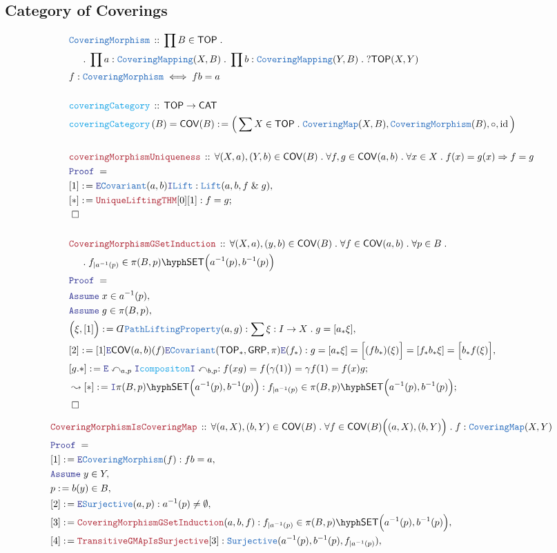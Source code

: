 \documentclass[12pt]{scrartcl}
\newcommand{\TYPE}[1]{\textcolor{NavyBlue}{\mathtt{#1}}}
\newcommand{\FUNC}[1]{\textcolor{Cerulean}{\mathtt{#1}}}
\newcommand{\LOGIC}[1]{\textcolor{Blue}{\mathtt{#1}}}
\newcommand{\THM}[1]{\textcolor{Maroon}{\mathtt{#1}}}
\renewcommand{\.}{\; . \;}
\newcommand{\de}{: \kern 0.1pc =}
\newcommand{\Act}[1]{\left( #1 \right)}
\newcommand{\Theorem}[2]{& \THM{#1} \, :: \, #2 \\ & \Proof = \\ }
\newcommand{\DeclareType}[2]{& \TYPE{#1} \, :: \, #2 \\}
\newcommand{\DefineType}[3]{& #1 : \TYPE{#2} \iff #3 \\}
\newcommand{\DeclareFunc}[2]{& \FUNC{#1} \, :: \, #2 \\}
\newcommand{\DefineNamedFunc}[4]{&  \FUNC{#1}\Act{#2} = #3 \de #4 \\}
\newcommand{\NewLine}{\\ & \kern 1pc}
\newcommand{\Page}[1]{ \begin{align*} #1 \end{align*}   }
\newcommand{ \bd }{ \ByDef }
\renewcommand{\And}{\; \& \;}
\newcommand{\Imply}{\Rightarrow}
\newcommand{\Intro}{\LOGIC{I}}
\newcommand{\Elim}{\LOGIC{E}}
\DeclareMathOperator*{\id}{id}
\newcommand{\Say}[3]{& #1 \de #2 : #3, \\}
\newcommand{\SayIn}[3]{& #1 \de #2 \in #3, \\}
\newcommand{\Conclude}[3]{& #1 \de #2 : #3; \\}
\newcommand{\DeriveConclude}[3]{& \leadsto #1 \de #2 : #3 ; \\}
\newcommand{\AssumeIn}[2]{& \LOGIC{Assume} \; #1 \in #2, \\}
\newcommand{\QED}{\; \square}
\newcommand{\EndProof}{& \QED \\}
\newcommand{\ByDef}{\rotatebox[origin=c]{-180}{$D$}}%
\newcommand{\Proof}{\LOGIC{Proof} \; }
\newcommand{\Cov}{\TYPE{Covariant}}
\newcommand{\CAT}{\mathsf{CAT}}
\newcommand{\SET}{\mathsf{SET}}
\newcommand{\TOP}{\mathsf{TOP}}
\newcommand{\action}{\curvearrowleft}
\newcommand{\GRP}{\mathsf{GRP}}
\newcommand{\COV}{\mathsf{COV}}
\begin{document}
\subsection{Category of Coverings}
\Page{
	\DeclareType{CoveringMorphism}{
		\prod B \in \TOP \. \NewLine \. 
		\prod a : \TYPE{CoveringMapping}(X,B) \.
		\prod b : \TYPE{CoveringMapping}(Y,B) \.
		?\TOP(X,Y)
	}
	\DefineType{f}{CoveringMorphism}{f b = a}
	\\
	\DeclareFunc{coveringCategory}{\TOP \to \CAT}
	\DefineNamedFunc{coveringCategory}{B}{\COV(B)}
	{
		\Big( \sum X \in \TOP \.\TYPE{CoveringMap}(X,B), \TYPE{CoveringMorphism}(B), \circ, \id   \Big)
	}
	\\
	\Theorem{coveringMorphismUniqueness}{ 
		\forall (X,a),(Y,b) \in \COV(B) \.
		\forall f,g \in \COV(a,b) \. 
		\forall x \in X \.
		f(x) = g(x) \Imply f = g
	}
	\Say{[1]}{
		\Elim \Cov(a,b) \Intro \TYPE{Lift} 
	}
	{
		\TYPE{Lift}(a,b,f \And g)
	}
	\Conclude{[*]}{
		\THM{UniqueLiftingTHM}[0][1]
	}
	{
		f = g
	}
	\EndProof
	\\
	\Theorem{CoveringMorphismGSetInduction}{ 
		\forall (X,a),(y,b) \in \COV(B) \.
		\forall f \in \COV(a,b) \. 
		\forall p \in B \. \NewLine \. 
		f_{| a^{-1}(p)}  \in \pi(B,p)\hyph\SET\Big( a^{-1}(p), b^{-1}(p) \Big)
	}
	\AssumeIn{x}{a^{-1}(p) }
	\AssumeIn{g}{\pi(B,p)}
	\Say{\Big( \xi, [1] \Big)}
	{
		\bd \TYPE{PathLiftingProperty}(a,g) 
	}
	{    
		\sum \xi : I \to X \.
		g = [a_* \xi]                                           
	}
	\Say{[2]}{ [1] \Elim \COV(a,b)(f) \Elim \Cov(\TOP_*,\GRP ,\pi) \Elim(f_*)  }
	{
		g = [a_* \xi] =
		\Big[ (fb_*) (\xi)  \Big]= 
		[ f_* b_* \xi ] = 
		\Big[ b_*  f(\xi) \Big] 
	}
	\Conclude{[g.*]}{ \Elim \action_{a,p} \Intro \FUNC{compositon} \Intro \action_{b,p}    }
	{
		f( x g  ) =  
		f\big( \gamma(1) \big) =
		\gamma f (1) =
		f(x) g
	}
	\DeriveConclude{[*]}{\Intro \pi(B,p)\hyph\SET\Big( a^{-1}(p),b^{-1}(p)\Big)}
	{
		f_{| a^{-1}(p)}  \in \pi(B,p)\hyph\SET\Big( a^{-1}(p), b^{-1}(p) \Big)
	}
	\EndProof
}\Page{
	\Theorem{CoveringMorphismIsCoveringMap}
	{
		\forall (a,X), (b,Y) \in \COV(B) \.
		\forall f \in \COV(B)\Big( (a,X), (b,Y) \Big) \.
		f : \TYPE{CoveringMap}(X,Y)
	}
	\Say{[1]}{\Elim \TYPE{CoveringMorphism}(f)}
	{
		fb = a
	}
	\AssumeIn{y}{Y}
	\SayIn{p}{b(y)}{B}
	\Say{[2]}{\Elim \TYPE{Surjective}(a,p)}
	{
		a^{-1}(p) \neq \emptyset
	}
	\Say{[3]}{\THM{CoveringMorphismGSetInduction}(a,b,f)}
	{
		f_{|a^{-1}(p)} \in \pi(B,p)\hyph\SET\Big(a^{-1}(p),b^{-1}(p)\Big)
	}
	\Say{[4]}{\THM{TransitiveGMApIsSurjective}[3]}
	{
		\TYPE{Surjective}(a^{-1}(p),b^{-1}(p),f_{|a^{-1}(p)})
	}
}
\end{document}
